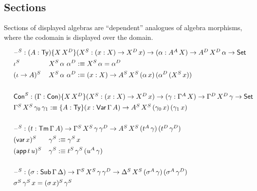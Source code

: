 \documentclass[12pt,a4paper,twoside,openany]{book}
\theoremstyle{remark}
\theoremstyle{definition}
\theoremstyle{theorem}
\newcommand{\ms}[1]{\mathsf{#1}}
\newcommand{\Con}{\mathsf{Con}}
\newcommand{\Sub}{\mathsf{Sub}}
\newcommand{\Tm}{\mathsf{Tm}}
\newcommand{\Ty}{\mathsf{Ty}}
\newcommand{\blank}{\mathord{\hspace{1pt}\text{--}\hspace{1pt}}}
\newcommand{\Set}{\mathsf{Set}}
\newcommand{\Var}{\ms{Var}}
\newcommand{\var}{\ms{var}}
\newcommand{\app}{\ms{app}}
\newcommand{\defn}{:\equiv}
\begin{document}
\subsection{Sections}

Sections of displayed algebras are ``dependent'' analogues of algebra morphisms,
where the codomain is displayed over the domain.

\begin{alignat*}{3}
  & \hspace{-6em}\rlap{$\blank^S : (A : \Ty)\{X\,X^D\}(X^S : (x : X) \to X^D\,x) \to (\alpha : A^A\,X) \to A^D\,X^D\,\alpha \to \Set$}\\
  & \hspace{-6em}\iota^S\,&&X^S\,\alpha\,\,\alpha^D \defn X^S\,\alpha = \alpha^D \\
  & \hspace{-6em}(\iota\to A)^S\,&&X^S\,\alpha\,\,\alpha^D \defn
  (x : X) \to A^S\,X^S\,(\alpha\,x)\,(\alpha^D\,(X^S\,x))\\
  & \hspace{-6em}&&\\
  &\hspace{-6em}\rlap{$\Con^S : (\Gamma : \Con)\{X\,X^D\}(X^S : (x : X) \to X^D\,x) \to (\gamma : \Gamma^A\,X) \to \Gamma^D\,X^D\,\gamma \to \Set$}\\
  &\hspace{-6em}\rlap{$\Gamma^S\,X^S\,\gamma_0\,\gamma_1 \defn
    \{A : \Ty\}(x : \Var\,\Gamma\,A) \to A^S\,X^S\,(\gamma_0\,x)\,(\gamma_1\,x)$}\\
  & \hspace{-6em} && \\
  & \hspace{-6em}\rlap{$\blank^S : (t : \Tm\,\Gamma\,A) \to \Gamma^S\,X^S\,\gamma\,\gamma^D \to A^S\,X^S\,(t^A\,\gamma)\,(t^D\,\gamma^D)$}\\
  & \hspace{-6em}(\var\,x)^S    &&\gamma^S \defn \gamma^S\,x \\
  & \hspace{-6em}(\app\,t\,u)^S &&\gamma^S \defn t^S\,\gamma^S\,(u^A\,\gamma)\\
  & \hspace{-6em}&& \\
  & \hspace{-6em}\rlap{$\blank^S : (\sigma : \Sub\,\Gamma\,\Delta) \to \Gamma^S\,X^S\,\gamma\,\gamma^D \to \Delta^S\,X^S\,(\sigma^A\,\gamma)\,(\sigma^A\,\gamma^D)$}\\
  & \hspace{-6em} \rlap{$\sigma^S\, \gamma^S\,x = (\sigma\,x)^S\,\gamma^S$}
\end{alignat*}
\end{document}

